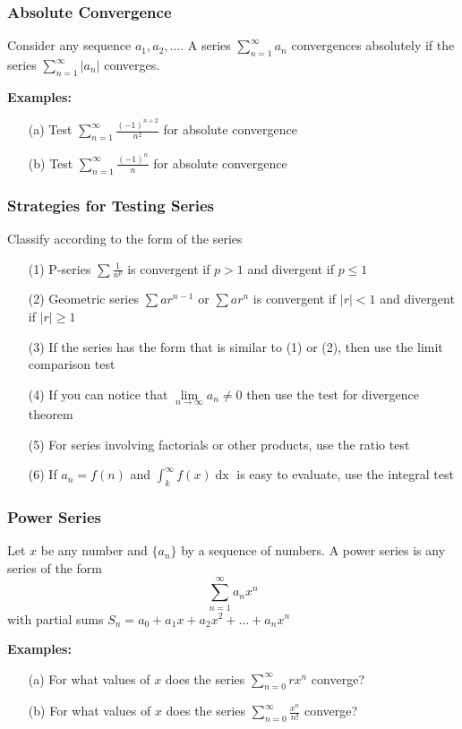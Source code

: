 \documentclass{beamer}
\begin{document}
\begin{frame}
\frametitle{Absolute Convergence}
Consider any sequence $a_1, a_2,...$. A series $\sum_{n=1}^\infty a_n$ convergences absolutely if the series $\sum_{n=1}^\infty |a_n|$ converges.

\vspace{12pt}
\textbf{Examples:}
\begin{itemize}
	\item[(a)] Test $\sum_{n=1}^\infty \frac{(-1)^{n+2}}{n^2}$ for absolute convergence
	\item[(b)]  Test $\sum_{n=1}^\infty \frac{(-1)^n}{n}$ for absolute convergence
\end{itemize}
\end{frame}


\begin{frame}
\frametitle{Strategies for Testing Series}
Classify according to the form of the series
\begin{itemize}
	\item[(1)] P-series $\sum \frac{1}{n^p}$ is convergent if $p>1$ and divergent if $p \leq 1$
	\item[(2)] Geometric series $\sum ar^{n-1}$ or $\sum ar^n$ is convergent if $|r| < 1$ and divergent if $|r| \geq 1$
	\item[(3)] If the series has the form that is similar to (1) or (2), then use the limit comparison test
	\item[(4)] If you can notice that $\lim\limits_{n \to \infty} a_n \neq 0$ then use the test for divergence theorem
	\item[(5)] For series involving factorials or other products, use the ratio test
	\item[(6)] If $a_n = f(n)$ and $\int_k^\infty f(x) \mathop{dx}$ is easy to evaluate, use the integral test
\end{itemize}
\end{frame}

\begin{frame}
\frametitle{Power Series}
Let $x$ be any number and $\{a_n\}$ by a sequence of numbers. A power series is any series of the form 
$$\sum_{n=1}^\infty a_n x^n$$
with partial sums $S_n = a_0 + a_1x + a_2x^2 + ... + a_nx^n$

\vspace{12pt}
\textbf{Examples:}
\begin{itemize}
	\item[(a)] For what values of $x$ does the series $\sum_{n=0}^\infty rx^n$ converge?
	\item[(b)] For what values of $x$ does the series $\sum_{n=0}^\infty \frac{x^n}{n!}$ converge?
\end{itemize}
\end{frame}
\end{document}

